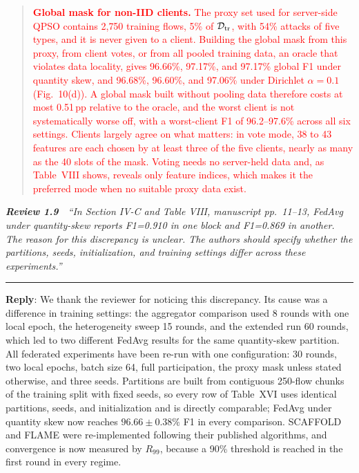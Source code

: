\documentclass[11pt]{article}
\newenvironment{excerpt}{\begin{quote}\sloppy}{\end{quote}}
\newcommand{\review}[2]{\par\bigskip\noindent\textbf{\textit{Review #1}}\ \ \textit{``#2''}\par\smallskip\hrule\medskip}
\newcommand{\reply}{\noindent\textbf{Reply}: }
\begin{document}
\begin{excerpt}
\textcolor{red}{\textbf{Global mask for non-IID clients.}
The proxy set used for server-side QPSO contains 2{,}750 training
flows, 5\% of $\mathcal{D}_{\rm tr}$, with 54\% attacks of five types,
and it is never given to a client. Building the global mask from this
proxy, from client votes, or from all pooled training data, an oracle
that violates data locality, gives 96.66\%, 97.17\%, and 97.17\%
global F1 under quantity skew, and 96.68\%, 96.60\%, and 97.06\% under
Dirichlet $\alpha=0.1$ (Fig.~10(d)). A
global mask built without pooling data therefore costs at most
0.51\,pp relative to the oracle, and the worst client is not
systematically worse off, with a worst-client F1 of 96.2--97.6\%
across all six settings. Clients largely agree on what matters: in
vote mode, 38 to 43 features are each chosen by at least three of the
five clients, nearly as many as the 40 slots of the mask. Voting needs no server-held data and,
as Table~VIII shows, reveals only feature indices,
which makes it the preferred mode when no suitable proxy data exist.}
\end{excerpt}

\review{1.9}{In Section IV-C and Table VIII, manuscript pp.~11--13, FedAvg under quantity-skew reports F1=0.910 in one block and F1=0.869 in another. The reason for this discrepancy is unclear. The authors should specify whether the partitions, seeds, initialization, and training settings differ across these experiments.}

\reply We thank the reviewer for noticing this discrepancy. Its cause was a
difference in training settings: the aggregator comparison used 8 rounds
with one local epoch, the heterogeneity sweep 15 rounds, and the extended run
60 rounds, which led to two different FedAvg results for the same quantity-skew
partition. All federated experiments have been re-run with one configuration:
30 rounds, two local epochs, batch size 64, full participation, the proxy mask
unless stated otherwise, and three seeds. Partitions are built from
contiguous 250-flow chunks of the training split with fixed seeds, so every
row of Table~XVI uses identical partitions, seeds, and initialization and is
directly comparable; FedAvg under quantity skew now reaches
$96.66\pm0.38\%$ F1 in every comparison. SCAFFOLD and FLAME were
re-implemented following their published algorithms, and convergence is now
measured by $R_{99}$, because a 90\% threshold is reached in the first round
in every regime.
\end{document}
